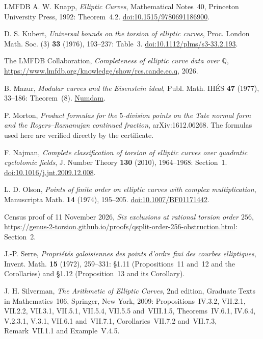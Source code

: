 \documentclass[11pt]{article}
\newcommand{\Q}{\mathbb Q}
\begin{document}
\begin{thebibliography}{LMFDB}
A. W. Knapp, \emph{Elliptic Curves}, Mathematical Notes~40, Princeton University Press, 1992: Theorem~4.2.
\href{https://doi.org/10.1515/9780691186900}{doi:10.1515/9780691186900}.

D. S. Kubert, \emph{Universal bounds on the torsion of elliptic curves}, Proc. London Math. Soc. (3) \textbf{33}
(1976), 193--237: Table~3.
\href{https://doi.org/10.1112/plms/s3-33.2.193}{doi:10.1112/plms/s3-33.2.193}.

The LMFDB Collaboration, \emph{Completeness of elliptic curve data over \(\Q\)},
\href{https://www.lmfdb.org/knowledge/show/rcs.cande.ec.q}{https://www.lmfdb.org/knowledge/\allowbreak show/\allowbreak rcs.cande.ec.q}, 2026.

B. Mazur, \emph{Modular curves and the Eisenstein ideal}, Publ. Math. IH\'ES \textbf{47} (1977), 33--186:
Theorem~(8). \href{https://www.numdam.org/item/PMIHES_1977__47__33_0/}{Numdam}.

P. Morton, \emph{Product formulas for the \(5\)-division points on the Tate normal form and the Rogers--Ramanujan
continued fraction}, arXiv:1612.06268. The formulas used here are verified directly by the certificate.

F. Najman, \emph{Complete classification of torsion of elliptic curves over quadratic cyclotomic fields}, J. Number
Theory \textbf{130} (2010), 1964--1968: Section~1.
\href{https://doi.org/10.1016/j.jnt.2009.12.008}{doi:10.1016/j.jnt.2009.12.008}.

L. D. Olson, \emph{Points of finite order on elliptic curves with complex multiplication}, Manuscripta Math.
\textbf{14} (1974), 195--205. \href{https://doi.org/10.1007/BF01171442}{doi:10.1007/BF01171442}.

Census proof of 11 November 2026, \emph{Six exclusions at rational torsion order \(256\)},
\href{https://genus-2-torsion.github.io/proofs/qsplit-order-256-obstruction.html}{https://genus-2-torsion.github.io/\allowbreak proofs/\allowbreak qsplit-order-256-obstruction.html}: Section~2.

J.-P. Serre, \emph{Propri\'et\'es galoisiennes des points d'ordre fini des courbes elliptiques}, Invent. Math.
\textbf{15} (1972), 259--331: \S1.11 (Propositions~11 and~12 and the Corollaries) and \S1.12 (Proposition~13 and its
Corollary).

J. H. Silverman, \emph{The Arithmetic of Elliptic Curves}, 2nd edition, Graduate Texts in Mathematics~106,
Springer, New York, 2009: Propositions~IV.3.2, VII.2.1, VII.2.2, VII.3.1, VII.5.1, VII.5.4, VII.5.5 and~VIII.1.5,
Theorems~IV.6.1, IV.6.4, V.2.3.1, V.3.1, VII.6.1 and~VII.7.1, Corollaries~VII.7.2 and~VII.7.3, Remark~VII.1.1 and
Example~V.4.5.


\end{thebibliography}
\end{document}
